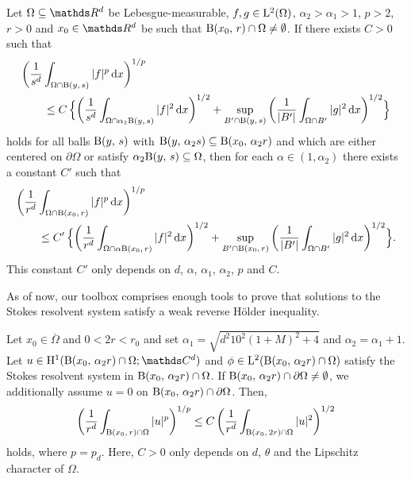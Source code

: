 \begin{lem}
  \label{lem:ballsforballs}
  Let $\Omega \subseteq \R^d$ be Lebesgue-measurable, $f, g \in \mathrm{L}^2(\Omega)$, $\alpha_2 > \alpha_1 > 1$, $p > 2$, $r > 0$ and $x_0 \in \R^d$ be such that $\mathrm{B}(x_0,\, r) \cap \Omega \neq \emptyset$.
  If there exists $C > 0$ such that
  \begin{align*}
    &\bigg( \frac{1}{s^d} \int_{\Omega \cap \mathrm{B}(y,\, s)} |f|^p \, {\operatorname{d}\!{x}} \bigg)^{1/p} \\
    &\qquad\leq C\, \Big\{ \bigg( \frac{1}{s^d} \int_{\Omega \cap \alpha_1 \mathrm{B}(y,\, s)} |f|^2 \, {\operatorname{d}\!{x}} \bigg)^{1/2} + \sup_{B' \cap \mathrm{B}(y,\,s)} \bigg( \frac{1}{|B'|} \int_{\Omega \cap B'} |g|^2 \, {\operatorname{d}\!{x}} \bigg)^{1/2} \Big\}
  \end{align*}
  holds for all balls $\mathrm{B}(y,\,s)$ with $\mathrm{B}(y,\,\alpha_2 s) \subseteq \mathrm{B}(x_0,\, \alpha_2 r)$ and which are either centered on $\partial\Omega$ or satisfy $\alpha_2 \mathrm{B}(y,\,s) \subseteq \Omega$, then for each $\alpha \in (1,\alpha_2)$ there exists a constant $C'$ such that
  \begin{align*}
    &\bigg( \frac{1}{r^d} \int_{\Omega \cap \mathrm{B}(x_0,\, r)} |f|^p \, {\operatorname{d}\!{x}} \bigg)^{1/p} 
    \\
    &\qquad\leq C'\, \Big\{ \bigg( \frac{1}{r^d} \int_{\Omega \cap \alpha \mathrm{B}(x_0,\, r)} |f|^2 \, {\operatorname{d}\!{x}} \bigg)^{1/2} + \sup_{B' \cap \mathrm{B}(x_0,\,r)} \bigg( \frac{1}{|B'|} \int_{\Omega \cap B'} |g|^2 \, {\operatorname{d}\!{x}} \bigg)^{1/2} \Big\}.
  \end{align*}
  This constant $C'$ only depends on $d$, $\alpha$, $\alpha_1$, $\alpha_2$, $p$ and $C$.
\end{lem}


As of now, our toolbox comprises enough tools to prove that solutions to the Stokes resolvent system satisfy a weak reverse H\"older inequality.

\begin{lem}
  \label{lem:reverseHoelder}
  Let $x_0 \in \overline\Omega$ and $0 < 2r < r_0$ and set $\alpha_1 = \sqrt{d^2 10^2 (1 + M)^2 + 4}$ and $\alpha_2 = \alpha_1 + 1$.
  Let $u \in \HH^1(\BB(x_0,\,  \alpha_2 r) \cap \Omega; \C^d)$ and $\phi \in \mathrm{L}^2(\mathrm{B}(x_0,\, \alpha_2 r) \cap \Omega)$ satisfy the Stokes resolvent system in $\mathrm{B}(x_0,\, \alpha_2 r) \cap \Omega$. 
  If $\mathrm{B}(x_0,\, \alpha_2 r) \cap \partial \Omega \neq \emptyset $, we additionally assume $u = 0$ on $\mathrm{B}(x_0,\, \alpha_2 r) \cap \partial\Omega$.
  Then,
  \begin{align}
    \label{eq:reverseHoelder}
    \bigg( \frac{1}{r^{d}} \int_{\mathrm{B}(x_0,\, r) \cap \Omega} |u|^p \bigg)^{1/p} \leq C \, \bigg( \frac{1}{r^{d}} \int_{\mathrm{B}(x_0,\, 2 r) \cap \Omega} |u|^2 \bigg)^{1/2}
  \end{align}
  holds, where $p = p_d$.
  Here, $C > 0$ only depends on $d$, $\theta$ and the Lipschitz character of $\Omega$.
\end{lem}

